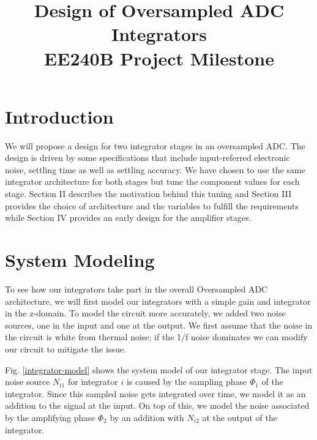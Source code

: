 \documentclass[conference]{IEEEtran}
\begin{document}
\title{Design of Oversampled ADC Integrators \\ \Large EE240B Project Milestone}
\author{
\and
{}
}
\maketitle

\section{Introduction}

We will propose a design for two integrator stages in an oversampled ADC. The design is driven by some specifications that include input-referred electronic noise, settling time as well as settling accuracy. We have chosen to use the same integrator architecture for both stages but tune the component values for each stage. Section II describes the motivation behind this tuning and Section III provides the choice of architecture and the variables to fulfill the requirements while Section IV provides an early design for the amplifier stages.



\section{System Modeling}

To see how our integrators take part in the overall Oversampled ADC architecture, we will first model our integrators with a simple gain and integrator in the z-domain. To model the circuit more accurately, we added two noise sources, one in the input and one at the output. We first assume that the noise in the circuit is white from thermal noise; if the 1/f noise dominates we can modify our circuit to mitigate the issue.

Fig. \ref{integrator-model} shows the system model of our integrator stage. The input noise source $N_{i1}$ for integrator $i$ is caused by the sampling phase $\Phi_1$ of the integrator. Since this sampled noise gets integrated over time, we model it as an addition to the signal at the input. On top of this, we model the noise associated by the amplifying phase $\Phi_2$ by an addition with $N_{i2}$ at the output of the integrator.
\end{document}
